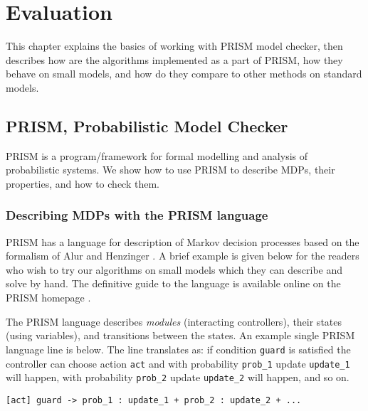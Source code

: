 \chapter{Evaluation}
\label{ch_evaluation}

This chapter explains the basics of working with PRISM model checker,
then describes how are the algorithms implemented as a part of PRISM,
how they behave on small models, and how do they compare to other
methods on standard models.

\section{PRISM, Probabilistic Model Checker}

PRISM \parencite{prism} is a program/framework
for formal modelling and analysis of probabilistic systems.
We show how to use PRISM to describe MDPs, their properties,
and how to check them.

\subsection*{Describing MDPs with the PRISM language}
PRISM has a language for description of Markov decision processes
based on the formalism of Alur and Henzinger \parencite{ReactiveModules}.
A brief example is given below for the readers who wish to try our
algorithms on small models which they can describe and solve by hand.
The definitive guide to the language is available online on the
PRISM homepage \parencite{prism_lang}.

The PRISM language describes {\em modules} (interacting controllers),
their states (using variables), and transitions between the states.
An example single PRISM language line is below. The line translates as:
if condition \verb|guard| is satisfied the controller can choose action \verb|act|
and
with probability \verb|prob_1| update \verb|update_1| will happen,
with probability \verb|prob_2| update \verb|update_2| will happen,
and so on.

\begin{verbatim}
[act] guard -> prob_1 : update_1 + prob_2 : update_2 + ...
\end{verbatim}

